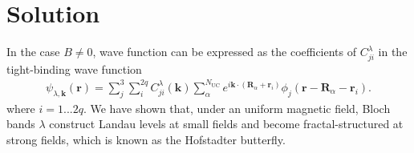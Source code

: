 \documentclass{article}
\newcommand{\thesistitlee}{title}
\newcommand{\graddate}{Ho Chi Minh City, 2025}
\begin{document}
%			
%			
%
\section{Solution}
In the case $B \neq 0$, wave function can be expressed as the coefficients of $C_{ji}^{\lambda}$ in the tight-binding wave function
\begin{gather}
	\psi_{\lambda,\mathbf{k}}(\mathbf{r}) = \sum_{j}^{3}\sum_{i}^{2q} C_{ji}^{\lambda}(\mathbf{k}) \sum_{{\alpha}}^{N_{\text{UC}}} e^{i\mathbf{k}\cdot(\mathbf{R}_{\alpha} + \mathbf{r}_{i})} \phi_{j}(\mathbf{r} - \mathbf{R}_{\alpha} - \mathbf{r}_{i}).
\end{gather}
where $i = 1 ... 2q$. We have shown that, under an uniform magnetic field, Bloch bands $\lambda$ construct Landau levels at small fields and become fractal-structured at strong fields, which is known as the Hofstadter butterfly.
\end{document}
